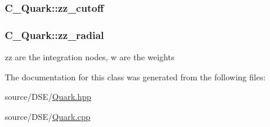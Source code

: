 \hypertarget{class_c___quark_a30161deac15ede23a568a44bb34f7f71}{
\subsubsection[{zz\-\_\-cutoff}]{ C\-\_\-\-Quark\-::zz\-\_\-cutoff\hspace{0.3cm}{\ttfamily [protected]}}}\label{class_c___quark_a30161deac15ede23a568a44bb34f7f71}
\hypertarget{class_c___quark_a6e1d141d7f38aba34e48fd51f4da95de}{
\subsubsection[{zz\-\_\-radial}]{ C\-\_\-\-Quark\-::zz\-\_\-radial\hspace{0.3cm}{\ttfamily [protected]}}}\label{class_c___quark_a6e1d141d7f38aba34e48fd51f4da95de}


zz are the integration nodes, w are the weights 



The documentation for this class was generated from the following files\-:\begin{DoxyCompactItemize}
\item 
source/\-D\-S\-E/\hyperlink{_quark_8hpp}{Quark.\-hpp}\item 
source/\-D\-S\-E/\hyperlink{_quark_8cpp}{Quark.\-cpp}\end{DoxyCompactItemize}
